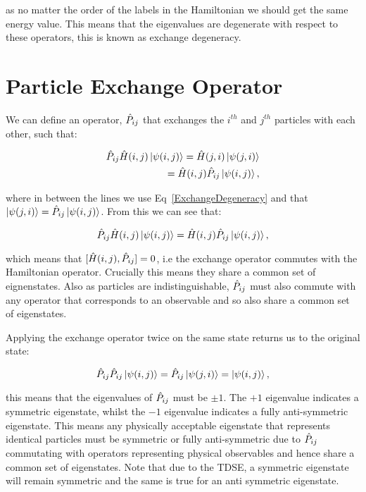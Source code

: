 \noindent as no matter the order of the labels in the Hamiltonian we should get the same energy value. This means that the eigenvalues are degenerate with respect to these operators, this is known as exchange degeneracy.

\section{Particle Exchange Operator}

We can define an operator, $\Hat{P}_{ij}$ that exchanges the $i^{th}$ and $j^{th}$ particles with each other, such that:

\begin{eqnarray}
    \Hat{P}_{ij} \Hat{H}(i, j) \ket{\psi(i, j)} = \Hat{H}(j, i) \ket{\psi(j, i)} \\
    \hspace{15mm} =\Hat{H}(i, j) \Hat{P}_{ij} \ket{\psi(i, j)},
\end{eqnarray}

\noindent where in between the lines we use Eq~\ref{ExchangeDegeneracy} and that $\ket{\psi(j, i)} = \Hat{P}_{ij} \ket{\psi(i, j)}$. From this we can see that:

\begin{equation}
    \Hat{P}_{ij} \Hat{H}(i, j) \ket{\psi(i, j)} = \Hat{H}(i, j) \Hat{P}_{ij} \ket{\psi(i, j)},
    \label{ExchangeOperatorCommutator}
\end{equation}

\noindent which means that $[\Hat{H}(i, j), \Hat{P}_{ij}] = 0$, i.e the exchange operator commutes with the Hamiltonian operator. Crucially this means they share a common set of eignenstates. Also as particles are indistinguishable, $\Hat{P}_{ij}$ must also commute with any operator that corresponds to an observable and so also share a common set of eigenstates.

\noindent Applying the exchange operator twice on the same state returns us to the original state:

\begin{equation}
    \Hat{P}_{ij} \Hat{P}_{ij} \ket{\psi(i, j)} = \Hat{P}_{ij} \ket{\psi(j, i)} = \ket{\psi(i, j)},
\end{equation}

\noindent this means that the eigenvalues of $\Hat{P}_{ij}$ must be $\pm1$. The $+1$ eigenvalue indicates a symmetric eigenstate, whilst the $-1$ eigenvalue indicates a fully anti-symmetric eigenstate. This means any physically acceptable eigenstate that represents identical particles must be symmetric or fully anti-symmetric due to $\Hat{P}_{ij}$ commutating with operators representing physical observables and hence share a common set of eigenstates. Note that due to the TDSE, a symmetric eigenstate will remain symmetric and the same is true for an anti symmetric eigenstate.

